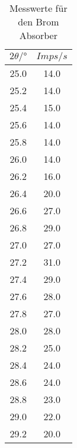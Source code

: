 \begin{table}[H]
    \centering
    \caption{Messwerte für den Brom Absorber}
    \label{tab:5}
    \begin{tabular}{c c}
        \toprule
        $2 \theta /° $ & $Imps/s$ \\
        \midrule
        25.0  & 14.0 \\
        25.2  & 14.0 \\
        25.4  & 15.0 \\
        25.6  & 14.0 \\
        25.8  & 14.0 \\
        26.0  & 14.0 \\
        26.2  & 16.0 \\
        26.4  & 20.0 \\
        26.6  & 27.0 \\
        26.8  & 29.0 \\
        27.0  & 27.0 \\
        27.2  & 31.0 \\
        27.4  & 29.0 \\
        27.6  & 28.0 \\
        27.8  & 27.0 \\
        28.0  & 28.0 \\
        28.2  & 25.0 \\
        28.4  & 24.0 \\
        28.6  & 24.0 \\
        28.8  & 23.0 \\
        29.0  & 22.0 \\
        29.2  & 20.0 \\ 
        \bottomrule
    \end{tabular}
\end{table}

